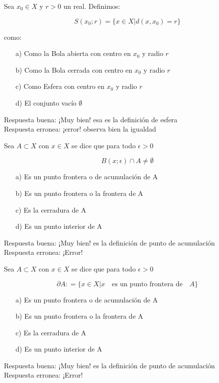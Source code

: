 \documentclass{exam}
\begin{document}
\begin{questions}
\question Sea $x_0 \in X$ y $r>0$ un real. Definimos:

\[S(x_0; r) = \lbrace x \in X | d(x,x_0) = r \rbrace\]

como:

\begin{itemize}
\item[a)] Como la Bola abierta con centro en $x_0$ y radio $r$
\item[b)] Como la Bola cerrada con centro en $x_0$ y radio $r$
\item[c)] Como Esfera con centro en $x_0$ y radio $r$
\item[d)] El conjunto vacío $\emptyset$
\end{itemize}

Respuesta buena: ¡Muy bien! esa es la definición de esfera\\
Respuesta erronea: ¡error! observa bien la igualdad

\question Sea $A \subset X$ con $x \in X$ se dice que para todo $\epsilon >0 $

\[B(x; \epsilon) \cap A \neq \emptyset\]

\begin{itemize}
\item[a)] Es un punto frontera o de acumulación de A
\item[b)] Es un punto frontera o la frontera de A
\item[c)] Es la cerradura de A
\item[d)] Es un punto interior de A
\end{itemize}

Respuesta buena: ¡Muy bien! es la definición de punto de acumulación\\
Respuesta erronea: ¡Error!

\question Sea $A \subset X$ con $x \in X$ se dice que para todo $\epsilon >0 $

\[\partial A : = \lbrace x \in X | x \quad \text{es un punto frontera de} \quad A \rbrace\]

\begin{itemize}
\item[a)] Es un punto frontera o de acumulación de A
\item[b)] Es un punto frontera o la frontera de A
\item[c)] Es la cerradura de A
\item[d)] Es un punto interior de A
\end{itemize}

Respuesta buena: ¡Muy bien! es la definición de punto de acumulación\\
Respuesta erronea: ¡Error!


\end{questions}
\end{document}
